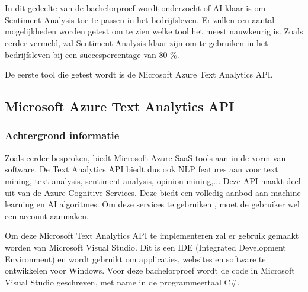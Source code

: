 
\chapter{}
\label{ch:methodologie}


In dit gedeelte van de bachelorproef wordt onderzocht of AI klaar is om Sentiment Analysis toe te passen in het bedrijfsleven. Er zullen een aantal mogelijkheden worden getest om te zien welke tool het meest nauwkeurig is. Zoals eerder vermeld, zal Sentiment Analysis klaar zijn om te gebruiken in het bedrijfsleven bij een succespercentage van 80 \%. 

De eerste tool die getest wordt is de Microsoft Azure Text Analytics API. 

\section{Microsoft Azure Text Analytics API}

\subsection{Achtergrond informatie}
\label{achtergrondinformatieazure}
Zoals eerder besproken, biedt Microsoft Azure SaaS-tools aan in de vorm van software. De Text Analytics API biedt dus ook NLP features aan voor text mining, text analysis, sentiment analysis, opinion mining,... \autocite{Microsoft2020} Deze API maakt deel uit van de Azure Cognitive Services. Deze biedt een volledig aanbod aan machine learning en AI algoritmes. Om deze services te gebruiken , moet de gebruiker wel een account aanmaken. \autocite{Microsoft2020}

Om deze Microsoft Text Analytics API te implementeren zal er gebruik gemaakt worden van Microsoft Visual Studio. Dit is een IDE (Integrated Development Environment) en wordt gebruikt om applicaties, websites en software te ontwikkelen voor Windows. Voor deze bachelorproef wordt de code in Microsoft Visual Studio geschreven, met name in de programmeertaal C\#. 


